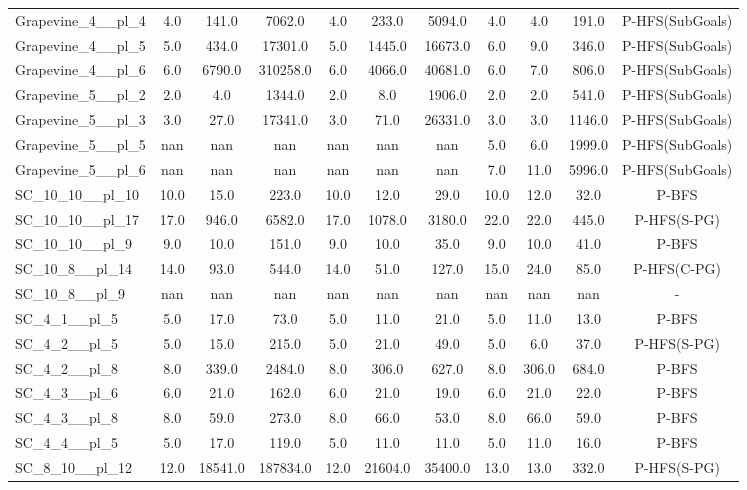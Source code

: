 \begin{table}[!ht]
\begin{tabular}{l|ccc|ccc|cccc}
Grapevine\_4\_\_pl\_4 & 4.0 & 141.0 & 7062.0 & 4.0 & 233.0 & 5094.0 & 4.0 & 4.0 & 191.0 & P-HFS(SubGoals) \\
Grapevine\_4\_\_pl\_5 & 5.0 & 434.0 & 17301.0 & 5.0 & 1445.0 & 16673.0 & 6.0 & 9.0 & 346.0 & P-HFS(SubGoals) \\
Grapevine\_4\_\_pl\_6 & 6.0 & 6790.0 & 310258.0 & 6.0 & 4066.0 & 40681.0 & 6.0 & 7.0 & 806.0 & P-HFS(SubGoals) \\
Grapevine\_5\_\_pl\_2 & 2.0 & 4.0 & 1344.0 & 2.0 & 8.0 & 1906.0 & 2.0 & 2.0 & 541.0 & P-HFS(SubGoals) \\
Grapevine\_5\_\_pl\_3 & 3.0 & 27.0 & 17341.0 & 3.0 & 71.0 & 26331.0 & 3.0 & 3.0 & 1146.0 & P-HFS(SubGoals) \\
Grapevine\_5\_\_pl\_5 & nan & nan & nan & nan & nan & nan & 5.0 & 6.0 & 1999.0 & P-HFS(SubGoals) \\
Grapevine\_5\_\_pl\_6 & nan & nan & nan & nan & nan & nan & 7.0 & 11.0 & 5996.0 & P-HFS(SubGoals) \\
SC\_10\_10\_\_pl\_10 & 10.0 & 15.0 & 223.0 & 10.0 & 12.0 & 29.0 & 10.0 & 12.0 & 32.0 & P-BFS \\
SC\_10\_10\_\_pl\_17 & 17.0 & 946.0 & 6582.0 & 17.0 & 1078.0 & 3180.0 & 22.0 & 22.0 & 445.0 & P-HFS(S-PG) \\
SC\_10\_10\_\_pl\_9 & 9.0 & 10.0 & 151.0 & 9.0 & 10.0 & 35.0 & 9.0 & 10.0 & 41.0 & P-BFS \\
SC\_10\_8\_\_pl\_14 & 14.0 & 93.0 & 544.0 & 14.0 & 51.0 & 127.0 & 15.0 & 24.0 & 85.0 & P-HFS(C-PG) \\
SC\_10\_8\_\_pl\_9 & nan & nan & nan & nan & nan & nan & nan & nan & nan & - \\
SC\_4\_1\_\_pl\_5 & 5.0 & 17.0 & 73.0 & 5.0 & 11.0 & 21.0 & 5.0 & 11.0 & 13.0 & P-BFS \\
SC\_4\_2\_\_pl\_5 & 5.0 & 15.0 & 215.0 & 5.0 & 21.0 & 49.0 & 5.0 & 6.0 & 37.0 & P-HFS(S-PG) \\
SC\_4\_2\_\_pl\_8 & 8.0 & 339.0 & 2484.0 & 8.0 & 306.0 & 627.0 & 8.0 & 306.0 & 684.0 & P-BFS \\
SC\_4\_3\_\_pl\_6 & 6.0 & 21.0 & 162.0 & 6.0 & 21.0 & 19.0 & 6.0 & 21.0 & 22.0 & P-BFS \\
SC\_4\_3\_\_pl\_8 & 8.0 & 59.0 & 273.0 & 8.0 & 66.0 & 53.0 & 8.0 & 66.0 & 59.0 & P-BFS \\
SC\_4\_4\_\_pl\_5 & 5.0 & 17.0 & 119.0 & 5.0 & 11.0 & 11.0 & 5.0 & 11.0 & 16.0 & P-BFS \\
SC\_8\_10\_\_pl\_12 & 12.0 & 18541.0 & 187834.0 & 12.0 & 21604.0 & 35400.0 & 13.0 & 13.0 & 332.0 & P-HFS(S-PG) \\

\end{tabular}
\end{table}
